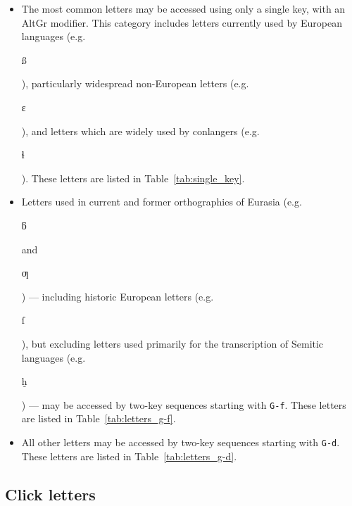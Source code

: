 \documentclass[oneside]{memoir}
\newcommand{\key}{\verb}
\newcommand{\out}[1]{\colorbox{gray!20}{\strut{}#1}}
\begin{document}
{{{\begin{itemize}
\item
  The most common letters may be accessed using only a single key, with an AltGr modifier.
  This category includes letters currently used by European languages (e.g.~\out{ß}),
    particularly widespread non-European letters (e.g.~\out{ɛ}),
    and letters which are widely used by conlangers (e.g.~\out{ɬ}).
  These letters are listed in Table~\ref{tab:single_key}.
\item
  Letters used in current and former orthographies of Eurasia (e.g.~\out{ƃ} and~\out{ƣ})
    --- including historic European letters (e.g.~\out{ſ}), but excluding letters used primarily for the transcription of Semitic languages (e.g.~\out{ḫ}) ---
    may be accessed by two-key sequences starting with \key|G-f|.
  These letters are listed in Table~\ref{tab:letters_g-f}.
\item
  All other letters may be accessed by two-key sequences starting with \key|G-d|.
  These letters are listed in Table~\ref{tab:letters_g-d}.
\end{itemize}

\subsection{Click letters}
\label{sec:clicks}

}}}
\end{document}
